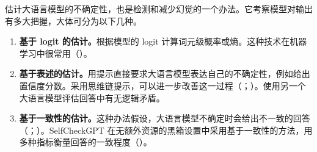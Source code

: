 估计大语言模型的不确定性，也是检测和减少幻觉的一个办法。它考察模型对输出有多大把握，大体可分为以下几种。

\begin{enumerate}
\item \textbf{基于 logit 的估计。}根据模型的 logit 计算词元级概率或熵。这种技术在机器学习中很常用（）。
\item \textbf{基于表述的估计。}用提示直接要求大语言模型表达自己的不确定性，例如给出置信度分数。采用思维链提示，可以进一步改善这一过程（；）。使用另一个大语言模型评估回答中有无逻辑矛盾。
\item \textbf{基于一致性的估计。}这种办法假设，大语言模型不确定时会给出不一致的回答（；）。SelfCheckGPT 在无额外资源的黑箱设置中采用基于一致性的方法，用多种指标衡量回答的一致程度（）。
\end{enumerate}
